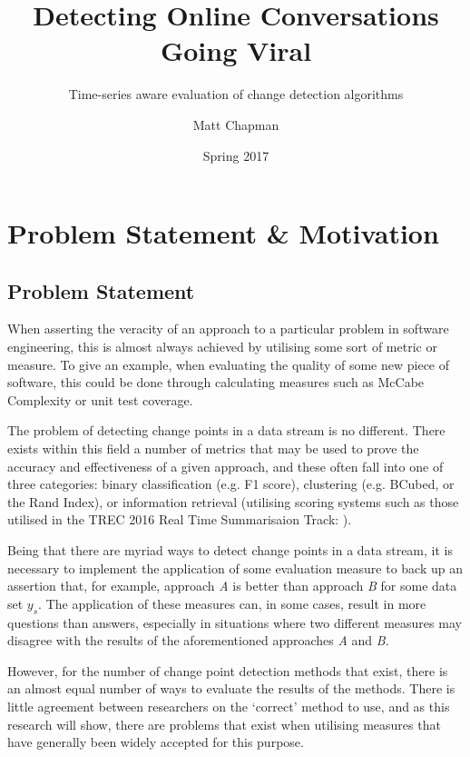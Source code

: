 \documentclass{uvamscse}	%
\title{Detecting Online Conversations Going Viral}
\subtitle{Time-series aware evaluation of change detection algorithms}
\date{Spring 2017}
\author{Matt Chapman}
\begin{document}
\maketitle


\chapter{Problem Statement \& Motivation}

\section{Problem Statement}
\label{Problem Statement}

When asserting the veracity of an approach to a particular problem in software engineering, this is almost always achieved by utilising some sort of metric or measure. To give an example, when evaluating the quality of some new piece of software, this could be done through calculating measures such as McCabe Complexity \cite{ThomasJ.McCabe1976} or unit test coverage.

The problem of detecting change points in a data stream is no different. There exists within this field a number of metrics that may be used to prove the accuracy and effectiveness of a given approach, and these often fall into one of three categories: binary classification (e.g. F1 score), clustering (e.g. BCubed, or the Rand Index), or information retrieval (utilising scoring systems such as those utilised in the TREC 2016 Real Time Summarisaion Track: \cite{trec2016}).

Being that there are myriad ways to detect change points in a data stream, it is necessary to implement the application of some evaluation measure to back up an assertion that, for example, approach \emph{A} is better than approach \emph{B} for some data set $y_s$. The application of these measures can, in some cases, result in more questions than answers, especially in situations where two different measures may disagree with the results of the aforementioned approaches \emph{A} and \emph{B}.

However, for the number of change point detection methods that exist, there is an almost equal number of ways to evaluate the results of the methods. There is little agreement between researchers on the `correct' method to use, and as this research will show, there are problems that exist when utilising measures that have generally been widely accepted for this purpose.
\end{document}
